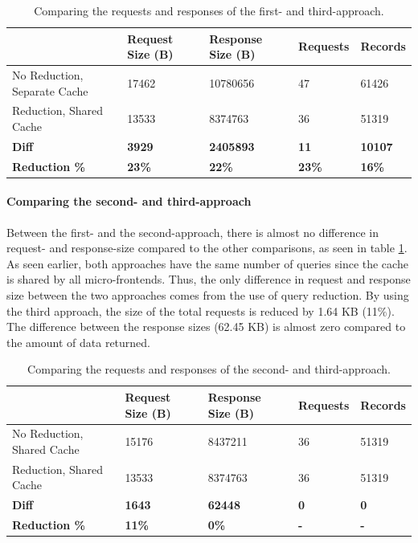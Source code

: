 \ifshowTables
\begin{table}[H]
    \begin{tabular}{|l|l|l|l|l|}
    \hline
       & Request Size (B) & Response Size (B) & Requests & Records  \\
    \hline
     No Reduction, Separate Cache & 17462 & 10780656 & 47 & 61426 \\
     \hline
     Reduction, Shared Cache & 13533 & 8374763 & 36 & 51319 \\
     \hline
     \hline
     \textbf{Diff} & \textbf{3929} & \textbf{2405893} & \textbf{11} & \textbf{10107} \\
     \hline
    \textbf{Reduction \%} & \textbf{23\%} & \textbf{22\%} & \textbf{23\%} & \textbf{16\%} \\
     \hline
    \end{tabular}
    \caption{Comparing the requests and responses of the first- and third-approach.}
    \label{table:results:size-comparison-first-path-no-cache-no-reduction-cache-reduction}
\end{table}
\fi

\paragraph{Comparing the second- and third-approach}

Between the first- and the second-approach, there is almost no difference in request- and response-size compared to the other comparisons, as seen in table \ref{table:results:size-comparison-first-path-no-cache-no-reduction-cache-reduction}. As seen earlier, both approaches have the same number of queries since the cache is shared by all micro-frontends. Thus, the only difference in request and response size between the two approaches comes from the use of query reduction. By using the third approach, the size of the total requests is reduced by 1.64 KB (11\%). The difference between the response sizes (62.45 KB) is almost zero compared to the amount of data returned.

\ifshowTables
\begin{table}[H]
    \begin{tabular}{|l|l|l|l|l|}
    \hline
      & Request Size (B) & Response Size (B) & Requests & Records \\
    \hline
     No Reduction, Shared Cache & 15176 &  8437211 & 36 & 51319 \\
     \hline
     Reduction, Shared Cache &  13533 &  8374763 & 36 & 51319 \\
     \hline
     \hline
     \textbf{Diff} & \textbf{1643} & \textbf{62448} & \textbf{0} & \textbf{0} \\
     \hline
     \textbf{Reduction \%} & \textbf{11\%} & \textbf{0\%} & \textbf{-} & \textbf{-} \\
     \hline
    \end{tabular}
    \caption{Comparing the requests and responses of the second- and third-approach.}
    \label{table:results:size-comparison-first-path-cache-no-reduction-cache-reduction}
\end{table}
\fi

